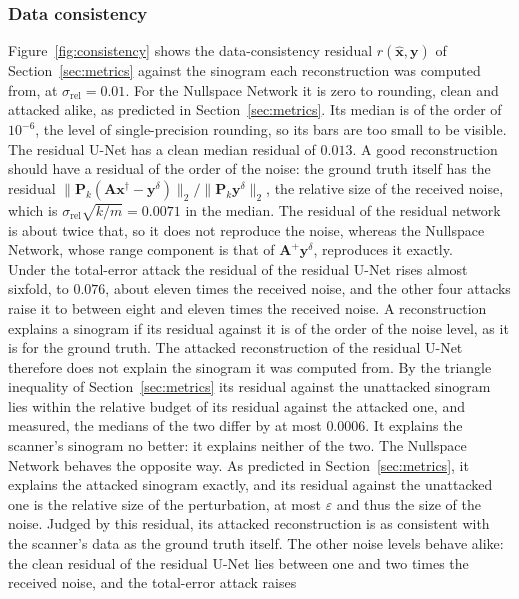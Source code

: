 \documentclass{article}
\numberwithin{equation}{section}
\begin{document}
\subsubsection{Data consistency}\label{sec:results-consistency}
Figure~\ref{fig:consistency} shows the data-consistency residual $r(\hat{\mathbf{x}},\mathbf{y})$ of
Section~\ref{sec:metrics} against the sinogram each reconstruction was computed from, at
$\sigma_\text{rel}=0.01$. For the Nullspace Network it is zero to rounding, clean and attacked
alike, as predicted in Section~\ref{sec:metrics}. Its median is of the
order of $10^{-6}$, the level of single-precision rounding, so its bars are too small to be visible.
The residual U-Net has a clean median residual of $0.013$. A good reconstruction should have a residual of the order of the noise:
the ground truth itself has the residual
$\lVert\mathbf{P}_k(\mathbf{A}\mathbf{x}^\dagger-\mathbf{y}^\delta)\rVert_2/\lVert\mathbf{P}_k\mathbf{y}^\delta\rVert_2$,
the relative size of the received noise, which is $\sigma_\text{rel}\sqrt{k/m}=0.0071$ in the median. The residual of the residual
network is about twice that, so it does not reproduce the noise, whereas the Nullspace Network, whose range
component is that of $\mathbf{A}^{+}\mathbf{y}^\delta$, reproduces it exactly.\\
Under the total-error attack the residual of the residual U-Net rises almost sixfold, to $0.076$, about
eleven times the received noise, and the other four attacks raise it to between eight and eleven times the
received noise. A reconstruction explains a sinogram if its residual against it is of the order of the
noise level, as it is for the ground truth. The attacked reconstruction of the residual U-Net therefore does not
explain the sinogram it was computed from. By the triangle inequality of Section~\ref{sec:metrics} its residual
against the unattacked sinogram lies within the relative budget of its residual against the attacked
one, and measured, the medians of the two differ by at most $0.0006$. It explains the scanner's sinogram
no better: it explains neither of the two.
The Nullspace Network behaves the opposite way. As predicted in Section~\ref{sec:metrics}, it explains
the attacked sinogram exactly, and its residual against the unattacked one is the relative size of the
perturbation, at most $\varepsilon$ and thus the size of the noise. Judged by this residual, its attacked
reconstruction is as consistent with the scanner's data as the ground truth itself. The other noise levels behave alike: the clean residual of
the residual U-Net lies between one and two times the received noise, and the total-error attack raises
\end{document}
